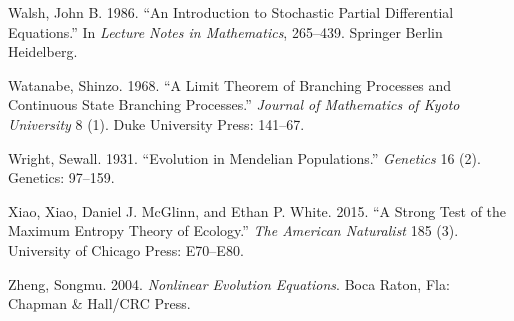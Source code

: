 \documentclass[]{article}
\begin{document}
\leavevmode\hypertarget{ref-Walsh}{}%
Walsh, John B. 1986. ``An Introduction to Stochastic Partial
Differential Equations.'' In \emph{Lecture Notes in Mathematics},
265--439. Springer Berlin Heidelberg.

\leavevmode\hypertarget{ref-Watanabe1968}{}%
Watanabe, Shinzo. 1968. ``A Limit Theorem of Branching Processes and
Continuous State Branching Processes.'' \emph{Journal of Mathematics of
Kyoto University} 8 (1). Duke University Press: 141--67.

\leavevmode\hypertarget{ref-Wright97}{}%
Wright, Sewall. 1931. ``Evolution in Mendelian Populations.''
\emph{Genetics} 16 (2). Genetics: 97--159.

\leavevmode\hypertarget{ref-Xiao2015}{}%
Xiao, Xiao, Daniel J. McGlinn, and Ethan P. White. 2015. ``A Strong Test
of the Maximum Entropy Theory of Ecology.'' \emph{The American
Naturalist} 185 (3). University of Chicago Press: E70--E80.

\leavevmode\hypertarget{ref-zheng2004nonlinear}{}%
Zheng, Songmu. 2004. \emph{Nonlinear Evolution Equations}. Boca Raton,
Fla: Chapman \& Hall/CRC Press.
\end{document}
